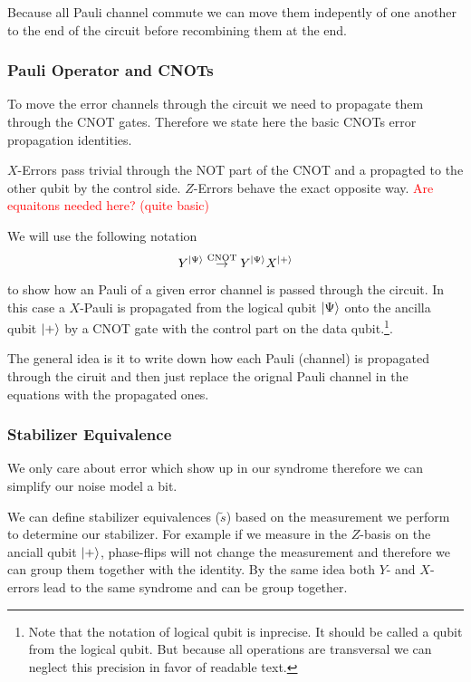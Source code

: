 Because all Pauli channel commute we can move them indepently of one another to the end of the circuit before recombining them at the end.

\subsubsection{Pauli Operator and CNOTs}\label{sssec:propagation_cnot}

To move the error channels through the circuit we need to propagate them through the CNOT gates.
Therefore we state here the basic CNOTs error propagation identities. 

$X$-Errors pass trivial through the NOT part of the CNOT and a propagted to the other qubit by the control side.
$Z$-Errors behave the exact opposite way.
\textcolor{red}{Are equaitons needed here? (quite basic)}

We will use the following notation
\begin{equation*}
    Y^{\ket{\Psi}} \overset{\text{CNOT}}{\rightarrow} Y^{\ket{\Psi}}X^{\ket{+}}  
\end{equation*}
to show how an Pauli of a given error channel is passed through the circuit.
In this case a $X$-Pauli is propagated from the logical qubit $\ket{\Psi}$ onto the ancilla qubit $\ket{+}$ by a CNOT gate with the control part on the data qubit.\footnote{
    Note that the notation of logical qubit is inprecise. It should be called a qubit from the logical qubit. 
    But because all operations are transversal we can neglect this precision in favor of readable text.
}.

The general idea is it to write down how each Pauli (channel) is propagated through the ciruit and then just replace the orignal Pauli channel in the equations with the propagated ones.

\subsubsection{Stabilizer Equivalence}\label{sssec:stab_equivalence}
We only care about error which show up in our syndrome therefore we can simplify our noise model a bit.

We can define stabilizer equivalences ($\tilde{s}$) based on the measurement we perform to determine our stabilizer.
For example if we measure in the $Z$-basis on the anciall qubit $\ket{+}$, 
phase-flips will not change the measurement and therefore we can group them together with the identity.
By the same idea both $Y$- and $X$-errors lead to the same syndrome and can be group together. 

